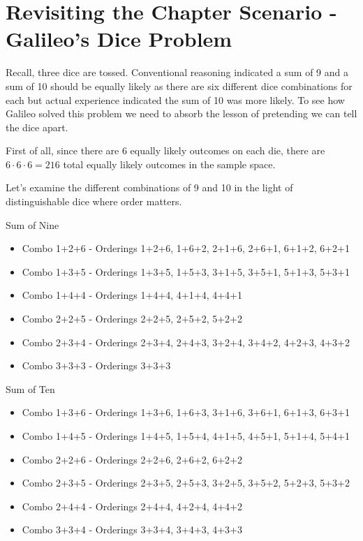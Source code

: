 \documentclass[]{book}
\providecommand{\tightlist}{%
  \setlength{\itemsep}{0pt}\setlength{\parskip}{0pt}}
\theoremstyle{definition}
\theoremstyle{definition}
\theoremstyle{definition}
\theoremstyle{remark}
\begin{document}
\section{Revisiting the Chapter Scenario - Galileo's Dice
Problem}\label{revisiting_chapter_scenario_galileo_dice_problem}

Recall, three dice are tossed. Conventional reasoning indicated a sum of
9 and a sum of 10 should be equally likely as there are six different
dice combinations for each but actual experience indicated the sum of 10
was more likely. To see how Galileo solved this problem we need to
absorb the lesson of pretending we can tell the dice apart.

First of all, since there are 6 equally likely outcomes on each die,
there are \(6 \cdot 6 \cdot 6=216\) total equally likely outcomes in the
sample space.

Let's examine the different combinations of 9 and 10 in the light of
distinguishable dice where order matters.

Sum of Nine

\begin{itemize}
\tightlist
\item
  Combo 1+2+6 - Orderings 1+2+6, 1+6+2, 2+1+6, 2+6+1, 6+1+2, 6+2+1
\item
  Combo 1+3+5 - Orderings 1+3+5, 1+5+3, 3+1+5, 3+5+1, 5+1+3, 5+3+1
\item
  Combo 1+4+4 - Orderings 1+4+4, 4+1+4, 4+4+1
\item
  Combo 2+2+5 - Orderings 2+2+5, 2+5+2, 5+2+2
\item
  Combo 2+3+4 - Orderings 2+3+4, 2+4+3, 3+2+4, 3+4+2, 4+2+3, 4+3+2
\item
  Combo 3+3+3 - Orderings 3+3+3
\end{itemize}

Sum of Ten

\begin{itemize}
\tightlist
\item
  Combo 1+3+6 - Orderings 1+3+6, 1+6+3, 3+1+6, 3+6+1, 6+1+3, 6+3+1
\item
  Combo 1+4+5 - Orderings 1+4+5, 1+5+4, 4+1+5, 4+5+1, 5+1+4, 5+4+1
\item
  Combo 2+2+6 - Orderings 2+2+6, 2+6+2, 6+2+2
\item
  Combo 2+3+5 - Orderings 2+3+5, 2+5+3, 3+2+5, 3+5+2, 5+2+3, 5+3+2
\item
  Combo 2+4+4 - Orderings 2+4+4, 4+2+4, 4+4+2
\item
  Combo 3+3+4 - Orderings 3+3+4, 3+4+3, 4+3+3
\end{itemize}
\end{document}
